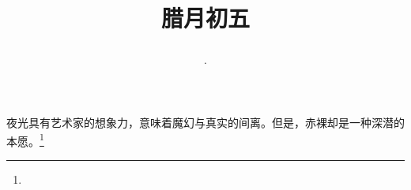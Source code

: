\title{\date[d=15,m=1,y=2024][year:cn-y,年,month:cn,day:cn,日,·,weekday]·腊月初五 }
夜光具有艺术家的想象力，意味着魔幻与真实的间离。但是，赤裸却是一种深潜的本愿。\footnote{ }

